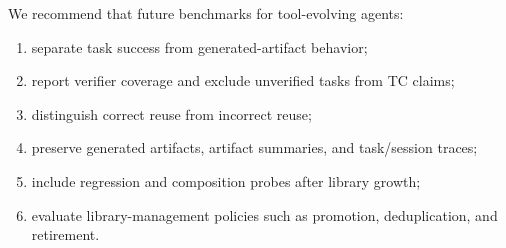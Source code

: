 \documentclass[sigconf,anonymous,natbib=false]{acmart}
\begin{document}
\begin{tcolorbox}[title=Reusable Evaluation Practices, colframe=black!70, colback=gray!5, boxrule=0.5pt]
We recommend that future benchmarks for tool-evolving agents:
\begin{enumerate}[noitemsep,leftmargin=1.2em]
  \item separate task success from generated-artifact behavior;
  \item report verifier coverage and exclude unverified tasks from TC claims;
  \item distinguish correct reuse from incorrect reuse;
  \item preserve generated artifacts, artifact summaries, and task/session traces;
  \item include regression and composition probes after library growth;
  \item evaluate library-management policies such as promotion, deduplication, and retirement.
\end{enumerate}
\end{tcolorbox}



\end{document}
